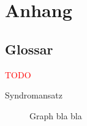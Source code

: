\documentclass[enabledeprecatedfontcommands,fontsize=11pt,paper=a4,twoside]{scrartcl}
\newcommand*{\red}{\textcolor{red}}
\begin{document}
\newpage
\section{Anhang} \label{sec:anhang}	

\subsection{Glossar}
\red{TODO}
	
\begin{description}
	\item[Syndromansatz] Graph bla bla
\end{description}
	

\newpage
\end{document}
